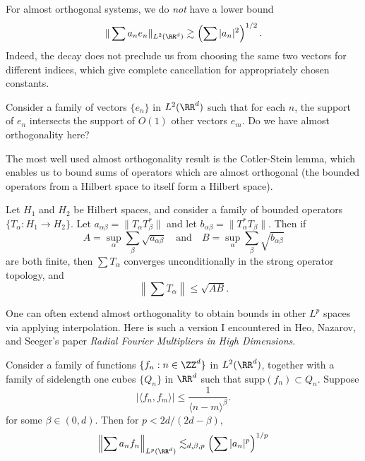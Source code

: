 For almost orthogonal systems, we do \emph{not} have a lower bound
%
\[ \| \sum a_n e_n \|_{L^2(\RR^d)} \gtrsim \left( \sum |a_n|^2 \right)^{1/2}. \]
%
Indeed, the decay does not preclude us from choosing the same two vectors for different indices, which give complete cancellation for appropriately chosen constants.

\begin{example}
  Consider a family of vectors $\{ e_n \}$ in $L^2(\RR^d)$ such that for each $n$, the support of $e_n$ intersects the support of $O(1)$ other vectors $e_m$. Do we have almost orthogonality here?
\end{example}



The most well used almost orthogonality result is the Cotler-Stein lemma, which enables us to bound sums of operators which are almost orthogonal (the bounded operators from a Hilbert space to itself form a Hilbert space).

\begin{theorem}
  Let $H_1$ and $H_2$ be Hilbert spaces, and consider a family of bounded operators $\{ T_\alpha : H_1 \to H_2 \}$. Let $a_{\alpha \beta} = \| T_\alpha T_\beta^* \|$ and let $b_{\alpha \beta} = \| T_\alpha^* T_\beta \|$. Then if
  \[ A = \sup_\alpha \sum_\beta \sqrt{a_{\alpha \beta}} \quad\text{and}\quad B = \sup_\alpha \sum_\beta \sqrt{b_{\alpha \beta}} \]
  are both finite, then $\sum T_\alpha$ converges unconditionally in the strong operator topology, and
  \[ \left\| \sum T_\alpha \right\| \leq \sqrt{AB}. \]
\end{theorem}

One can often extend almost orthogonality to obtain bounds in other $L^p$ spaces via applying interpolation. Here is such a version I encountered in Heo, Nazarov, and Seeger's paper \emph{Radial Fourier Multipliers in High Dimensions}.

\begin{theorem}
  Consider a family of functions $\{ f_n : n \in \ZZ^d \}$ in $L^2(\RR^d)$, together with a family of sidelength one cubes $\{ Q_n \}$ in $\RR^d$ such that $\text{supp}(f_n) \subset Q_n$. Suppose
  \[ |\langle f_n, f_m \rangle| \leq \frac{1}{\langle n - m \rangle^\beta}. \]
  for some $\beta \in (0,d)$. Then for $p < 2d/(2d - \beta)$,
  \[ \left\| \sum a_n f_n \right\|_{L^p(\RR^d)} \lesssim_{d,\beta,p} \left( \sum |a_n|^p \right)^{1/p} \]
\end{theorem}

